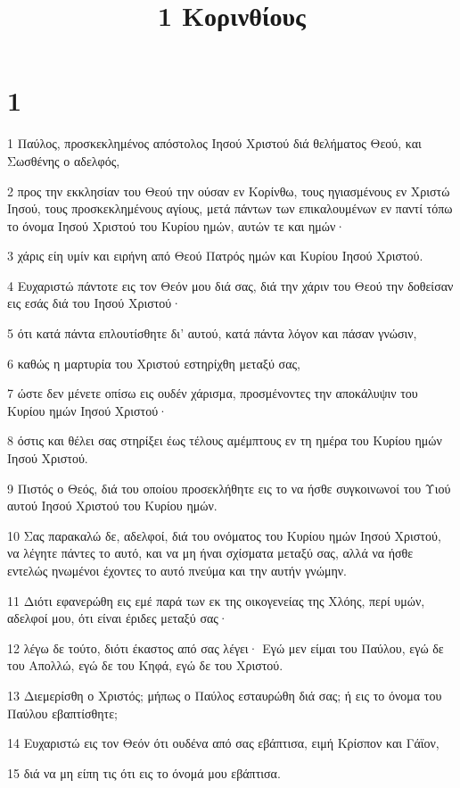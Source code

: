 

\title{1 Κορινθίους}


\chapter{1}

\par 1 Παύλος, προσκεκλημένος απόστολος Ιησού Χριστού διά θελήματος Θεού, και Σωσθένης ο αδελφός,
\par 2 προς την εκκλησίαν του Θεού την ούσαν εν Κορίνθω, τους ηγιασμένους εν Χριστώ Ιησού, τους προσκεκλημένους αγίους, μετά πάντων των επικαλουμένων εν παντί τόπω το όνομα Ιησού Χριστού του Κυρίου ημών, αυτών τε και ημών·
\par 3 χάρις είη υμίν και ειρήνη από Θεού Πατρός ημών και Κυρίου Ιησού Χριστού.
\par 4 Ευχαριστώ πάντοτε εις τον Θεόν μου διά σας, διά την χάριν του Θεού την δοθείσαν εις εσάς διά του Ιησού Χριστού·
\par 5 ότι κατά πάντα επλουτίσθητε δι' αυτού, κατά πάντα λόγον και πάσαν γνώσιν,
\par 6 καθώς η μαρτυρία του Χριστού εστηρίχθη μεταξύ σας,
\par 7 ώστε δεν μένετε οπίσω εις ουδέν χάρισμα, προσμένοντες την αποκάλυψιν του Κυρίου ημών Ιησού Χριστού·
\par 8 όστις και θέλει σας στηρίξει έως τέλους αμέμπτους εν τη ημέρα του Κυρίου ημών Ιησού Χριστού.
\par 9 Πιστός ο Θεός, διά του οποίου προσεκλήθητε εις το να ήσθε συγκοινωνοί του Υιού αυτού Ιησού Χριστού του Κυρίου ημών.
\par 10 Σας παρακαλώ δε, αδελφοί, διά του ονόματος του Κυρίου ημών Ιησού Χριστού, να λέγητε πάντες το αυτό, και να μη ήναι σχίσματα μεταξύ σας, αλλά να ήσθε εντελώς ηνωμένοι έχοντες το αυτό πνεύμα και την αυτήν γνώμην.
\par 11 Διότι εφανερώθη εις εμέ παρά των εκ της οικογενείας της Χλόης, περί υμών, αδελφοί μου, ότι είναι έριδες μεταξύ σας·
\par 12 λέγω δε τούτο, διότι έκαστος από σας λέγει· Εγώ μεν είμαι του Παύλου, εγώ δε του Απολλώ, εγώ δε του Κηφά, εγώ δε του Χριστού.
\par 13 Διεμερίσθη ο Χριστός; μήπως ο Παύλος εσταυρώθη διά σας; ή εις το όνομα του Παύλου εβαπτίσθητε;
\par 14 Ευχαριστώ εις τον Θεόν ότι ουδένα από σας εβάπτισα, ειμή Κρίσπον και Γάϊον,
\par 15 διά να μη είπη τις ότι εις το όνομά μου εβάπτισα.
